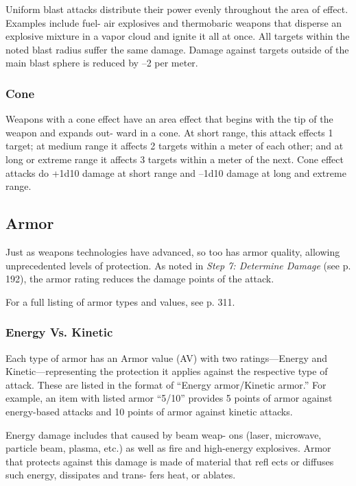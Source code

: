 Uniform blast attacks distribute their power evenly 
throughout the area of effect. Examples include fuel-
air explosives and thermobaric weapons that disperse 
an explosive mixture in a vapor cloud and ignite it all 
at once. All targets within the noted blast radius suffer 
the same damage. Damage against targets outside of 
the main blast sphere is reduced by –2 per meter.

\subsubsection{Cone}

Weapons with a cone effect have an area effect that 
begins with the tip of the weapon and expands out-
ward in a cone. At short range, this attack effects 1 
target; at medium range it affects 2 targets within a 
meter of each other; and at long or extreme range 
it affects 3 targets within a meter of the next. Cone 
effect attacks do +1d10 damage at short range and 
–1d10 damage at long and extreme range.

\subsection{Armor}

Just as weapons technologies have advanced, so too 
has armor quality, allowing unprecedented levels of 
protection. As noted in \textit{Step 7: Determine Damage}
(see p. 192), the armor rating reduces the damage 
points of the attack.

For a full listing of armor types and values, see p. 311.

\subsubsection{Energy Vs. Kinetic}

Each type of armor has an Armor value (AV) with 
two ratings—Energy and Kinetic—representing 
the protection it applies against the respective type 
of attack. These are listed in the format of ``Energy 
armor/Kinetic armor.'' For example, an item with 
listed armor ``5/10'' provides 5 points of armor against 
energy-based attacks and 10 points of armor against 
kinetic attacks.

Energy damage includes that caused by beam weap-
ons (laser, microwave, particle beam, plasma, etc.) as 
well as fire and high-energy explosives. Armor that 
protects against this damage is made of material that 
refl ects or diffuses such energy, dissipates and trans-
fers heat, or ablates.

